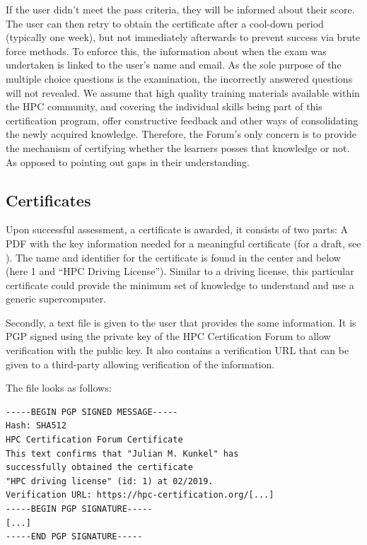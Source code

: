 \documentclass[jocse]{jocseart}
\begin{document}
If the user didn't meet the pass criteria, they will be informed about their score.
The user can then retry to obtain the certificate after a cool-down period (typically one week), but not immediately afterwards to prevent success via brute force methods.
To enforce this, the information about when the exam was undertaken is linked to the user's name and email.
As the sole purpose of the multiple choice questions is the examination, the incorrectly answered questions will not revealed. 
We assume that high quality training materials available within the HPC community, and covering the individual skills being part of this certification program, offer constructive feedback and other ways of consolidating the newly acquired knowledge. Therefore, the Forum's only concern is to provide the mechanism of certifying whether the learners posses that knowledge or not. As opposed to pointing out gaps in their understanding.   


\subsection{Certificates}

Upon successful assessment, a certificate is awarded, it consists of two parts:
A PDF with the key information needed for a meaningful certificate (for a draft, see ).
The name and identifier for the certificate is found in the center and below (here 1 and “HPC Driving License”).
Similar to a driving license, this particular certificate could provide the minimum set of knowledge to understand and use a generic supercomputer.

Secondly, a text file is given to the user that provides the same information.
It is PGP signed using the private key of the HPC Certification Forum to allow verification with the  public key.
It also contains a verification URL that can be given to a third-party allowing verification of the information.

The file looks as follows:
\begin{verbatim}
-----BEGIN PGP SIGNED MESSAGE-----
Hash: SHA512
HPC Certification Forum Certificate
This text confirms that "Julian M. Kunkel" has
successfully obtained the certificate
"HPC driving license" (id: 1) at 02/2019.
Verification URL: https://hpc-certification.org/[...]
-----BEGIN PGP SIGNATURE-----
[...]
-----END PGP SIGNATURE-----
\end{verbatim}
\end{document}
